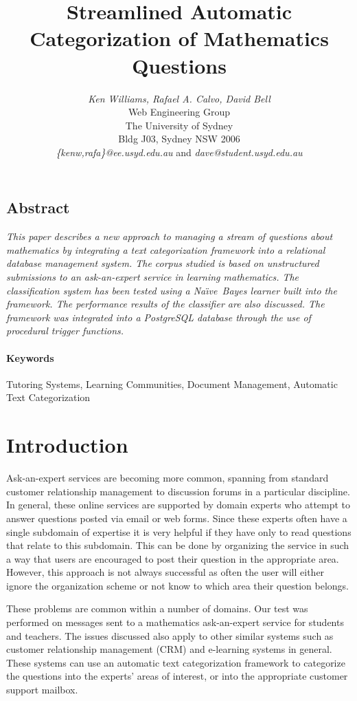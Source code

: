 \documentclass{article}
\title{Streamlined Automatic Categorization of Mathematics Questions}
\author{
{\em Ken Williams, Rafael A. Calvo, David Bell}\\[1ex]
Web Engineering Group\\
The University of Sydney\\
Bldg J03, Sydney NSW 2006\\[1ex]
{\em {\{kenw,rafa\}}@ee.usyd.edu.au} and
{\em dave@student.usyd.edu.au}
}
\newcommand{\naive}{Na\"\i ve}
\begin{document}
\maketitle
\thispagestyle{empty}

\subsection*{\centering Abstract}
\noindent
{\it 
This paper describes a new approach to managing a stream of questions about 
mathematics by integrating a text categorization framework into a relational database 
management system. The corpus studied is based on unstructured submissions to an 
ask-an-expert service in learning mathematics. The classification system has 
been tested using a \naive\ Bayes learner built into the framework. The 
performance results of the classifier are also discussed. The framework was integrated 
into a PostgreSQL database through the use of procedural trigger functions.
}

\paragraph{Keywords} 
Tutoring Systems, Learning Communities, Document Management, Automatic
Text Categorization



\section{Introduction}

Ask-an-expert services are becoming more common, spanning from standard 
customer relationship management to discussion forums in a particular discipline. In 
general, these online services are supported by domain experts who attempt to answer 
questions posted via email or web forms. Since these experts often have a single subdomain of expertise it is 
very helpful if they have only to read questions that relate to this subdomain. This can be 
done by organizing the service in such a way that users are encouraged to post their 
question in the appropriate area. However, this approach is not always successful as 
often the user will either ignore the organization scheme or not know to which area their 
question belongs. 

These problems are common within a number of domains. Our test was performed on 
messages sent to a mathematics ask-an-expert
service for students and teachers.\cite{drmath} The issues 
discussed also apply to other similar systems such as customer relationship 
management (CRM) and e-learning systems in general. These systems can use an 
automatic text categorization framework to categorize the questions into the experts' 
areas of interest, or into the appropriate customer support mailbox. 
\end{document}
